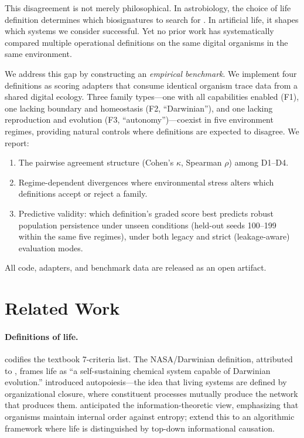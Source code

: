 \documentclass[letterpaper]{article}
\begin{document}
This disagreement is not merely philosophical.  In astrobiology, the choice
of life definition determines which biosignatures to search for
\citep{benner_2010_defining}.  In artificial life, it shapes which systems
we consider successful.  Yet no prior work has systematically compared
multiple operational definitions on the same digital organisms in the same
environment.

We address this gap by constructing an \emph{empirical benchmark}.  We
implement four definitions as scoring adapters that consume identical
organism trace data from a shared digital ecology.  Three family types---one
with all capabilities enabled (F1), one lacking boundary and homeostasis
(F2, ``Darwinian''), and one lacking reproduction and evolution
(F3, ``autonomy'')---coexist in five environment regimes, providing natural
controls where definitions are expected to disagree.  We report:
\begin{enumerate}
\item The pairwise agreement structure (Cohen's $\kappa$, Spearman $\rho$)
  among D1--D4.
\item Regime-dependent divergences where environmental stress alters
  which definitions accept or reject a family.
\item Predictive validity: which definition's graded score best predicts
  robust population persistence under unseen conditions (held-out seeds
  100--199 within the same five regimes), under both legacy and strict
  (leakage-aware) evaluation modes.
\end{enumerate}

All code, adapters, and benchmark data are released as an open artifact.

\section{Related Work}
\label{sec:related}

\paragraph{Definitions of life.}
\citet{campbell_2017_biology} codifies the textbook 7-criteria list.
The NASA/Darwinian definition, attributed to \citet{joyce_1994_foreword},
frames life as ``a self-sustaining chemical system capable of Darwinian
evolution.''  \citet{varela_1974_autopoiesis} introduced autopoiesis---the
idea that living systems are defined by organizational closure,
where constituent processes mutually produce the network that produces them.
\citet{schrodinger_1944_what} anticipated the information-theoretic view,
emphasizing that organisms maintain internal order against entropy;
\citet{walker_2013_algorithmic} extend this to an algorithmic framework
where life is distinguished by top-down informational causation.
\end{document}
